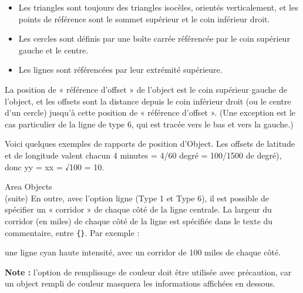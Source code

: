 \begin{aprsbodyblock}
\begin{itemize}\tightlist
\item
  Les triangles sont toujours des triangles isocèles, orientés
  verticalement, et les points de référence sont le sommet supérieur et le
  coin inférieur droit.
\item
  Les cercles sont définis par une boîte carrée référencée par le coin
  supérieur gauche et le centre.
\item
  Les lignes sont référencées par leur extrémité supérieure.
\end{itemize}

La position de « référence d'offset » de l'object est le coin supérieur
gauche de l'object, et les offsets sont la distance depuis le coin
inférieur droit (ou le centre d'un cercle) jusqu'à cette position de
« référence d'offset ». (Une exception est le cas particulier de la ligne
de type 6, qui est tracée vers le bas et vers la gauche.)

Voici quelques exemples de rapports de position d'Object. Les offsets de
latitude et de longitude valent chacun 4 minutes = 4/60 degré = 100/1500 de
degré), donc yy = xx = √100 = 10.
\end{aprsbodyblock}

\begin{aprsexample}



\end{aprsexample}

\begin{aprssideblock}{Area Objects\\(suite)}
En outre, avec l'option ligne (Type 1 et Type 6), il est possible de
spécifier un « corridor » de chaque côté de la ligne centrale. La largeur
du corridor (en miles) de chaque côté de la ligne est spécifiée dans le
texte du commentaire, entre \texttt{\{\}}. Par exemple :

une ligne cyan haute intensité, avec un corridor de 100 miles de chaque
côté.

\textbf{Note :} l'option de remplissage de couleur doit être utilisée avec
précaution, car un object rempli de couleur masquera les informations
affichées en dessous.
\end{aprssideblock}

